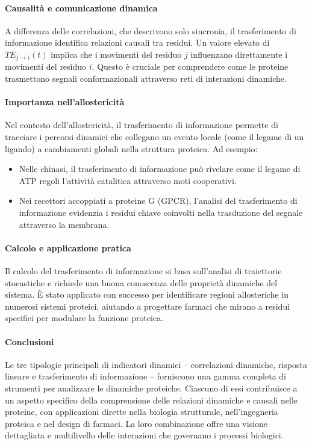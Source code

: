 \documentclass[Lau,binding=0.6cm,oneside,noexaminfo]{sapthesis}
\begin{document}
\paragraph{Causalità e comunicazione dinamica}
A differenza delle correlazioni, che descrivono solo sincronia, il trasferimento di informazione identifica relazioni causali tra residui. Un valore elevato di $TE_{j \to i}(t)$ implica che i movimenti del residuo $j$ influenzano direttamente i movimenti del residuo $i$. Questo è cruciale per comprendere come le proteine trasmettono segnali conformazionali attraverso reti di interazioni dinamiche.

\paragraph{Importanza nell'allostericità}
Nel contesto dell'allostericità, il trasferimento di informazione permette di tracciare i percorsi dinamici che collegano un evento locale (come il legame di un ligando) a cambiamenti globali nella struttura proteica. Ad esempio:
\begin{itemize}
    \item Nelle chinasi, il trasferimento di informazione può rivelare come il legame di ATP regoli l'attività catalitica attraverso moti cooperativi.
    \item Nei recettori accoppiati a proteine G (GPCR), l’analisi del trasferimento di informazione evidenzia i residui chiave coinvolti nella trasduzione del segnale attraverso la membrana.
\end{itemize}

\paragraph{Calcolo e applicazione pratica}
Il calcolo del trasferimento di informazione si basa sull'analisi di traiettorie stocastiche e richiede una buona conoscenza delle proprietà dinamiche del sistema. È stato applicato con successo per identificare regioni allosteriche in numerosi sistemi proteici, aiutando a progettare farmaci che mirano a residui specifici per modulare la funzione proteica.

\paragraph{Conclusioni}
Le tre tipologie principali di indicatori dinamici – correlazioni dinamiche, risposta lineare e trasferimento di informazione – forniscono una gamma completa di strumenti per analizzare le dinamiche proteiche. Ciascuno di essi contribuisce a un aspetto specifico della comprensione delle relazioni dinamiche e causali nelle proteine, con applicazioni dirette nella biologia strutturale, nell'ingegneria proteica e nel design di farmaci. La loro combinazione offre una visione dettagliata e multilivello delle interazioni che governano i processi biologici.
\end{document}
